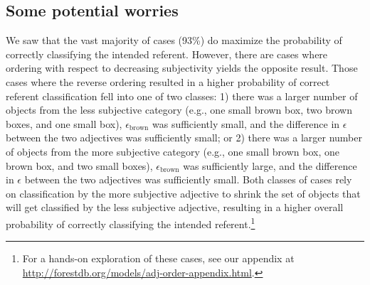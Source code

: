 \documentclass[preprint,authoryear]{elsarticle}\frenchspacing
\begin{document}
%




\subsection{Some potential worries}

We saw that the vast majority of cases (93\%) do maximize the probability of correctly classifying the intended referent. However, there are cases where ordering with respect to decreasing subjectivity yields the opposite result. Those cases where the reverse ordering resulted in a higher probability of correct referent classification fell into one of two classes: 1) there was a larger number of objects from the less subjective category (e.g., one small brown box, two brown boxes, and one small box), $\epsilon_{\textrm{brown}}$ was sufficiently small, and the difference in $\epsilon$ between the two adjectives was sufficiently small; or 2) there was a larger number of objects from the more subjective category (e.g., one small brown box, one brown box, and two small boxes), $\epsilon_{\textrm{brown}}$ was sufficiently large, and the difference in $\epsilon$ between the two adjectives was sufficiently small. Both classes of cases rely on classification by the more subjective adjective to shrink the set of objects that will get classified by the less subjective adjective, resulting in a higher overall probability of correctly classifying the intended referent.\footnote{For a hands-on exploration of these cases, see our appendix at \href{http://forestdb.org/models/adj-order-appendix.html}{http://forestdb.org/models/adj-order-appendix.html}.}
\end{document}
